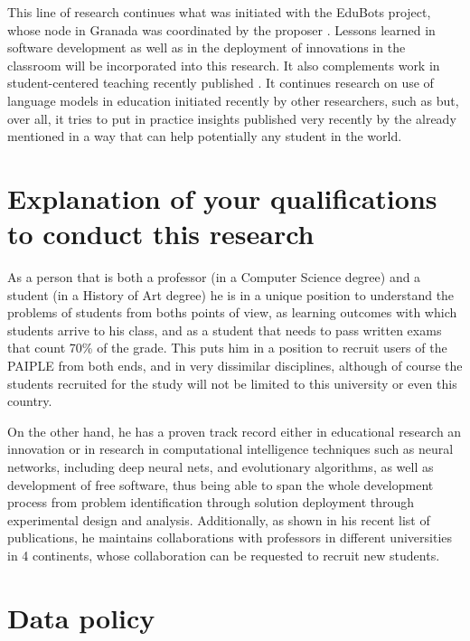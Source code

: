 \documentclass[a4paper,12pt]{article}
\begin{document}
This line of research continues what was initiated with the EduBots project,
whose node in Granada was coordinated by the proposer
\cite{DBLP:journals/eait/MereloCMBAGT24,DBLP:conf/hci/MoraGBCG21}. Lessons
learned in software development as well as in the deployment of innovations in
the classroom will be incorporated into this research. It also complements work
in student-centered teaching recently published \cite{10481/89811}. It continues
research on use of language models in education initiated recently by other
researchers, such as \cite{li2024adaptinglargelanguagemodels} but, over all, it
tries to put in practice insights published  very recently by the already mentioned
\cite{ruiz2024learning} in a way that can help potentially any student in the world.


\section{Explanation of your qualifications to conduct this research}

As a person that is both a professor (in a Computer Science degree) and a
student (in a History of Art degree) he is in a unique position to understand
the problems of students from boths points of view, as learning outcomes with
which students arrive to his class, and as a student that needs to pass written
exams that count 70\% of the grade. This puts him in a position to recruit users
of the PAIPLE from both ends, and in very dissimilar disciplines, although of
course the students recruited for the study will not be limited to this
university or even this country.

On the other hand, he has a proven track record either in educational research
an innovation
\cite{DBLP:conf/ijcci/ValdezGHS17,DBLP:journals/eait/MereloCMBAGT24} or in
research in computational intelligence techniques such as neural networks,
including deep neural nets, and evolutionary algorithms, as well as development
of free software, thus being able to span the whole development process from
problem identification through solution deployment through experimental design
and analysis. Additionally, as shown in his recent list of publications, he
maintains collaborations with professors in different universities in 4
continents, whose collaboration can be requested to recruit new students.

\section{Data policy}
\end{document}
